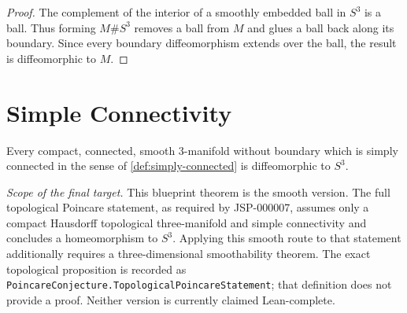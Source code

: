 \begin{proof}
The complement of the interior of a smoothly embedded ball in $S^3$ is a
ball.  Thus forming $M\#S^3$ removes a ball from $M$ and glues a ball back
along its boundary.  Since every boundary diffeomorphism extends over the
ball, the result is diffeomorphic to $M$.
\end{proof}

\section{Simple Connectivity}

\begin{theorem}
\label{thm:poincare-conjecture}
\notready
Every compact, connected, smooth $3$-manifold without boundary which is
simply connected in the sense of \ref{def:simply-connected} is diffeomorphic
to $S^3$.
\end{theorem}

\textit{Scope of the final target.}  This blueprint theorem is the smooth
version.  The full topological Poincare statement, as required by JSP-000007,
assumes only a compact Hausdorff topological three-manifold and simple
connectivity and concludes a homeomorphism to $S^3$.  Applying this smooth
route to that statement additionally requires a three-dimensional
smoothability theorem.  The exact topological proposition is recorded as
\texttt{PoincareConjecture.TopologicalPoincareStatement}; that definition
does not provide a proof.  Neither version is currently claimed Lean-complete.

